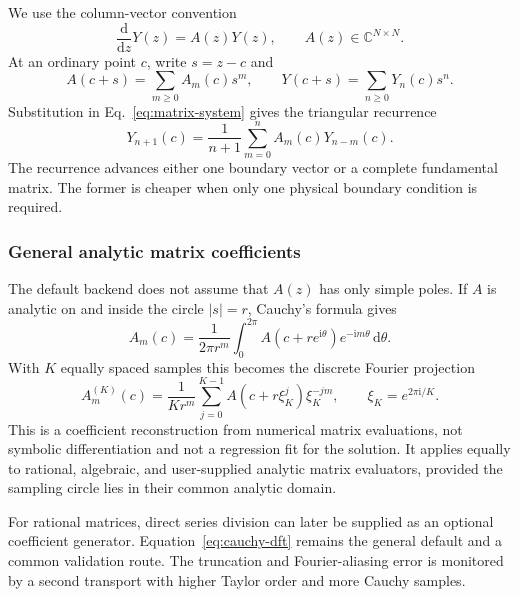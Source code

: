 \documentclass[11pt]{article}
\newcommand{\dd}{\mathrm d}
\begin{document}
We use the column-vector convention
\begin{equation}
  \frac{\dd}{\dd z}Y(z)=A(z)Y(z),
  \qquad A(z)\in\mathbb C^{N\times N}.
  \label{eq:matrix-system}
\end{equation}
At an ordinary point $c$, write $s=z-c$ and
\begin{equation}
  A(c+s)=\sum_{m\geq0}A_m(c)s^m,
  \qquad
  Y(c+s)=\sum_{n\geq0}Y_n(c)s^n.
\end{equation}
Substitution in Eq.~\eqref{eq:matrix-system} gives the triangular recurrence
\begin{equation}
  Y_{n+1}(c)=\frac{1}{n+1}\sum_{m=0}^{n}A_m(c)Y_{n-m}(c).
  \label{eq:ordinary-recurrence}
\end{equation}
The recurrence advances either one boundary vector or a complete fundamental matrix.  The
former is cheaper when only one physical boundary condition is required.

\subsubsection{General analytic matrix coefficients}

The default backend does not assume that $A(z)$ has only simple poles.  If $A$ is analytic
on and inside the circle $|s|=r$, Cauchy's formula gives
\begin{equation}
  A_m(c)=\frac{1}{2\pi r^m}\int_0^{2\pi}
  A(c+r e^{\mathrm i\theta})e^{-\mathrm i m\theta}\,\dd\theta.
\end{equation}
With $K$ equally spaced samples this becomes the discrete Fourier projection
\begin{equation}
  A_m^{(K)}(c)=\frac{1}{K r^m}\sum_{j=0}^{K-1}
  A(c+r\xi_K^j)\xi_K^{-jm},
  \qquad \xi_K=e^{2\pi\mathrm i/K}.
  \label{eq:cauchy-dft}
\end{equation}
This is a coefficient reconstruction from numerical matrix evaluations, not symbolic
differentiation and not a regression fit for the solution.  It applies equally to rational,
algebraic, and user-supplied analytic
matrix evaluators, provided the sampling circle lies in their common analytic domain.

For rational matrices, direct series division can later be supplied as an optional
coefficient generator.  Equation~\eqref{eq:cauchy-dft} remains the general default and a
common validation route.  The truncation and Fourier-aliasing error is monitored by a second
transport with higher Taylor order and more Cauchy samples.
\end{document}
